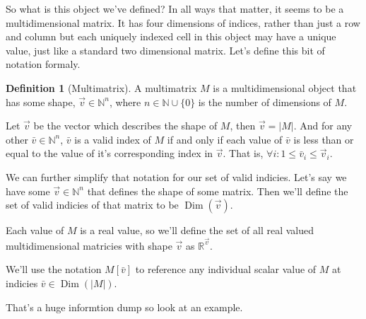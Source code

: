 \documentclass[12pt]{book}
\theoremstyle{plain}
\theoremstyle{definition}
\newtheorem{definition}{Definition}[chapter]
\theoremstyle{ppart}
\theoremstyle{case}
\theoremstyle{solution}
\DeclareMathOperator{\Dim}{Dim}
\begin{document}
So what is this object we've defined? In all ways that matter, it seems to be
a multidimensional matrix. It has four dimensions of indices, rather than just
a row and column but each uniquely indexed cell in this object may have a
unique value, just like a standard two dimensional matrix. Let's define this
bit of notation formaly.

\begin{definition}[Multimatrix]
A multimatrix $M$ is a multidimensional object that has some shape,
$\vec{v} \in \mathbb{N}^n$, where $n \in \mathbb{N} \cup \{0\}$
is the number of dimensions of $M$.

Let $\vec{v}$ be the vector which describes the shape of
$M$, then $\vec{v} = |M|$. And for any other $\bar{v} \in \mathbb{N}^n$, $\bar{v}$
is a valid index of $M$ if and only if each value of $\bar{v}$ is less than or equal
to the value of it's corresponding index in $\vec{v}$.
That is, $\forall i: 1 \le \bar{v}_i \le \vec{v}_i$.

We can further simplify that notation for our set of valid indicies. Let's say we have
some $\vec{v} \in \mathbb{N}^n$ that defines the shape of some matrix. Then we'll
define the set of valid indicies of that matrix to be $\Dim(\vec{v})$. 

Each value of $M$ is a real value, so we'll define the set of all real valued
multidimensional matricies with shape $\vec{v}$ as $\mathbb{R}^{\vec{v}}$.

We'll use the notation $M[\bar{v}]$ to reference any individual scalar value of $M$
at indicies $\bar{v} \in \Dim(|M|)$. 
\end{definition}

That's a huge informtion dump so look at an example.
\end{document}

